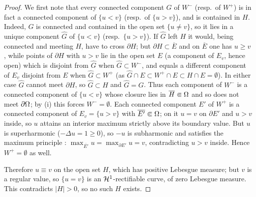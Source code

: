 \begin{proof}
We first note that every connected component $G$ of $W^-$ (resp.\ of $W^+$)
is in fact a connected component of $\{u<v\}$ (resp.\ of $\{u>v\}$), and is
contained in $H$. Indeed, $G$ is connected and contained in the open set
$\{u\ne v\}$, so it lies in a unique component $\hat G$ of $\{u<v\}$ (resp.\
$\{u>v\}$). If $\hat G$ left $H$ it would, being connected and meeting $H$,
have to cross $\partial H$; but $\partial H\subset\overline E$ and on
$\overline E$ one has $u\ge v$, while points of $\partial H$ with $u>v$ lie in
the open set $E$ (a component of $E_v$, hence open) which is disjoint from
$\hat G$ when $\hat G\subset W^-$, and equals a different component of $E_v$
disjoint from $E$ when $\hat G\subset W^+$ (as $\hat G\cap E\subset W^+\cap
E\subset H\cap E=\emptyset$). In either case $\hat G$ cannot meet $\partial H$,
so $\hat G\subset H$ and $\hat G=G$. Thus each component of $W^-$ is a
connected component of $\{u<v\}$
whose closure lies in $\overline H\Subset\Omega$ and so does not meet
$\partial\Omega$; by (i) this forces $W^-=\emptyset$. Each connected component
$E'$ of $W^+$ is a connected component of $E_v=\{u>v\}$ with
$\overline{E'}\Subset\Omega$; on it $u=v$ on $\partial E'$ and $u>v$ inside, so
$u$ attains an interior maximum strictly above its boundary value. But $u$
is superharmonic ($-\Delta u=1\ge0$), so $-u$ is subharmonic and satisfies
the maximum principle \cite[Theorem~3.1]{GilbargTrudinger2001}:
$\max_{\overline{E'}}u=\max_{\partial E'}u=v$, contradicting $u>v$ inside.
Hence $W^+=\emptyset$ as well.

Therefore $u\equiv v$ on the open set $H$, which has positive Lebesgue
measure; but $v$ is a regular value, so $\{u=v\}$ is an $\mathcal{H}^1$-rectifiable
curve, of zero Lebesgue measure. This contradicts $|H|>0$, so no such $H$
exists.
\end{proof}

